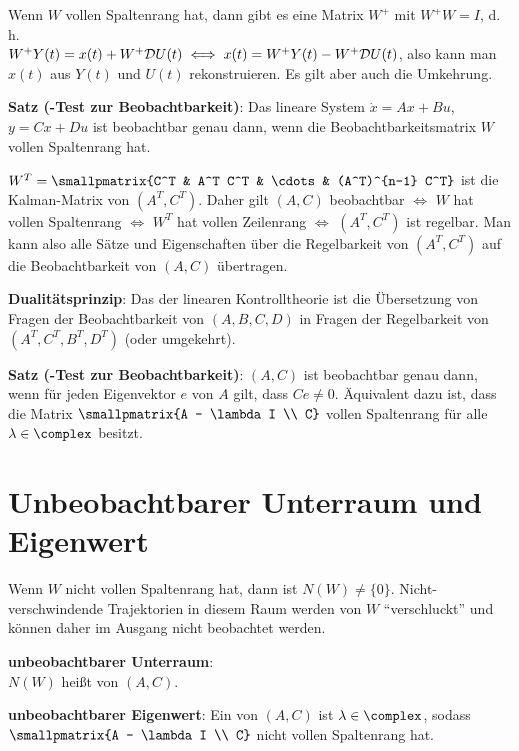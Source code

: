 \linie

Wenn $W$ vollen Spaltenrang hat, dann gibt es eine Matrix $W^+$ mit $W^+ W = I$,
d.\,h.\\
$W^+ Y(t) = x(t) + W^+ \mathcal{D} U(t) \iff x(t) = W^+ Y(t) - W^+ \mathcal{D} U(t)$,
also kann man $x(t)$ aus $Y(t)$ und $U(t)$ rekonstruieren.
Es gilt aber auch die Umkehrung.

\textbf{Satz (-Test zur Beobachtbarkeit)}:
Das lineare System $\dot{x} = Ax + Bu$, $y = Cx + Du$ ist beobachtbar genau dann,
wenn die Beobachtbarkeitsmatrix $W$ vollen Spaltenrang hat.

$W^T = \smallpmatrix{C^T & A^T C^T & \cdots & (A^T)^{n-1} C^T}$ ist die Kalman-Matrix
von $(A^T, C^T)$.
Daher gilt $(A, C)$ beobachtbar $\iff$ $W$ hat vollen Spaltenrang $\iff$ $W^T$ hat vollen
Zeilenrang $\iff$ $(A^T, C^T)$ ist regelbar.
Man kann also alle Sätze und Eigenschaften über die Regelbarkeit von $(A^T, C^T)$ auf
die Beobachtbarkeit von $(A, C)$ übertragen.

\textbf{Dualitätsprinzip}:
Das 
der linearen Kontrolltheorie ist die Übersetzung von Fragen
der Beobachtbarkeit von $(A, B, C, D)$ in Fragen der Regelbarkeit von $(A^T, C^T, B^T, D^T)$
(oder umgekehrt).

\textbf{Satz (-Test zur Beobachtbarkeit)}:
$(A, C)$ ist beobachtbar genau dann, wenn für jeden Eigenvektor $e$ von $A$ gilt,
dass $Ce \not= 0$.
Äquivalent dazu ist, dass die Matrix $\smallpmatrix{A - \lambda I \\ C}$
vollen Spaltenrang für alle $\lambda \in \complex$ besitzt.

\pagebreak

\section{%
    Unbeobachtbarer Unterraum und Eigenwert%
}

Wenn $W$ nicht vollen Spaltenrang hat, dann ist $N(W) \not= \{0\}$.
Nicht-verschwindende Trajektorien in diesem Raum werden von $W$ "`verschluckt"'
und können daher im Ausgang nicht beobachtet werden.

\textbf{unbeobachtbarer Unterraum}:\\
$N(W)$ heißt  von $(A, C)$.

\textbf{unbeobachtbarer Eigenwert}:
Ein  von $(A, C)$ ist
$\lambda \in \complex$, sodass $\smallpmatrix{A - \lambda I \\ C}$ nicht vollen Spaltenrang hat.

